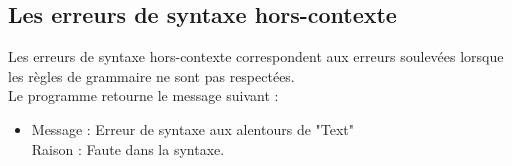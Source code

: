 \documentclass[11pt]{article}
\begin{document}
   \subsection{Les erreurs de syntaxe hors-contexte}
      Les erreurs de syntaxe hors-contexte correspondent aux erreurs soulevées lorsque les règles de grammaire ne sont pas respectées.\\
      Le programme retourne le message suivant :
      \\
      \begin{itemize}
      \item   Message : Erreur de syntaxe aux alentours de "Text" \\ 
	      Raison :  Faute dans la syntaxe. 	          
      \end{itemize}
\end{document}
